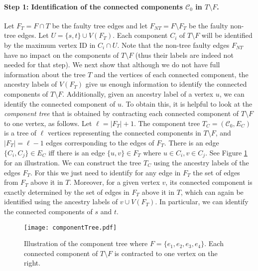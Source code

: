 \paragraph{Step 1: Identification of the connected components $\mathcal{C}_0$ in $T \setminus F$.} 
Let $F_T=F \cap T$ be the faulty tree edges and let $F_{NT}=F \setminus F_T$ be the faulty non-tree edges. Let $U=\{s,t\} \cup V(F_T)$.  Each component $C_i$ of $T \setminus F$ will be identified by the maximum vertex ID in $C_i \cap U$. Note that the non-tree faulty edges $F_{NT}$ have no impact on the components of $T \setminus F$ (thus their labels are indeed not needed for that step).
We next show that although we do not have full information about the tree $T$ and the vertices of each connected component, the ancestry labels of $V(F_T)$ give us enough information to identify the connected components of $T \setminus F$. Additionally, given an ancestry label of a vertex $u$, we can identify the connected component of $u$. To obtain this, it is helpful to look at the \emph{component tree} that is obtained by contracting each connected component of $T \setminus F$ to one vertex, as follows. Let $\ell = |F_T|+1.$ The component tree $T_C = (\mathcal{C}_0, E_C)$ is a tree of $\ell$ vertices representing the connected components in $T \setminus F$, and $|F_T|=\ell-1$ edges corresponding to the edges of $F_T$. There is an edge $\{C_i,C_j\} \in E_C$ iff there is an edge $\{u,v\} \in F_T$ where $u \in C_i, v \in C_j$. See Figure \ref{componentTreePic} for an illustration.  We can construct the tree $T_C$ using the ancestry labels of the edges $F_T$. For this we just need to identify for any edge in $F_T$ the set of edges from $F_T$ above it in $T$. Moreover, for a given vertex $v$, its connected component is exactly determined by the set of edges in $F_T$ above it in $T$, which can again be identified using the ancestry labels of $v \cup V(F_T)$. In particular, we can identify the connected components of $s$ and $t$. 

\setlength{\intextsep}{0pt}
\begin{figure}[h]
\centering
\setlength{\abovecaptionskip}{-2pt}
\setlength{\belowcaptionskip}{6pt}
\texttt{[image: componentTree.pdf]}
 \caption{Illustration of the component tree where $F=\{e_1,e_2,e_3,e_4\}$. Each connected component of $T \setminus F$ is contracted to one vertex on the right.}
\label{componentTreePic}
\end{figure}
 

